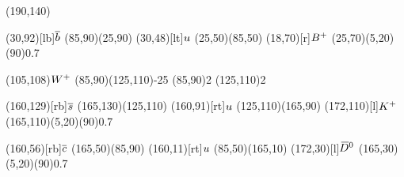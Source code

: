 \documentclass{standalone}
\begin{document}
\begin{axopicture}(190,140)

  \Text(30,92)[lb]{${\overline {{b}}}$}     %
  \Line[arrow](85,90)(25,90)         %
  \Text(30,48)[lt]{${u}$}        %
  \Line[arrow](25,50)(85,50)         %
  \Text(18,70)[r]{${{{B}^+}}$}             %
  \GOval(25,70)(5,20)(90){0.7}       %
                                     
  \Text(105,108){\small{${W^+}$}}      %
  \Photon(85,90)(125,110){-2}{5}     %
  \Vertex(85,90){2}                  %
  \Vertex(125,110){2}                %
                                     
  \Text(160,129)[rb]{${\overline {{s}}}$}   %
  \Line[arrow](165,130)(125,110)     %
  \Text(160,91)[rt]{${u}$}       %
  \Line[arrow](125,110)(165,90)      %
  \Text(172,110)[l]{${{K}^+}$}           %
  \GOval(165,110)(5,20)(90){0.7}     %
                                     
  \Text(160,56)[rb]{${\overline {{c}}}$}    %
  \Line[arrow](165,50)(85,90)        %
  \Text(160,11)[rt]{${u}$}       %
  \Line[arrow](85,50)(165,10)        %
  \Text(172,30)[l]{${{\kern 0.18em\overline{\kern -0.18em D}}{}^0}$}           %
  \GOval(165,30)(5,20)(90){0.7}      %
                                     
\end{axopicture}
\end{document}
